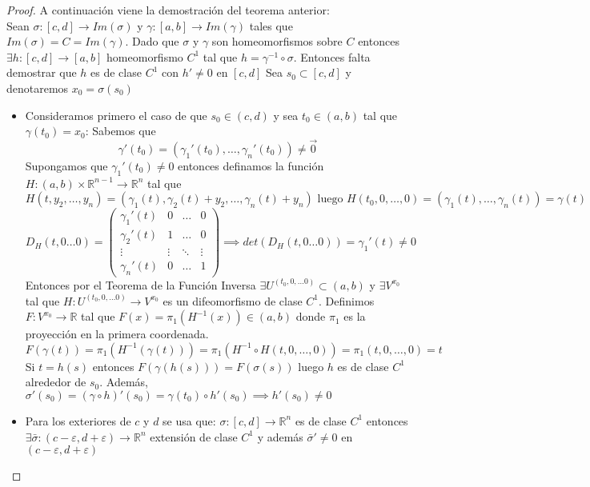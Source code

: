 \begin{proof}
    A continuación viene la demostración del teorema anterior: \\
    Sean $\sigma: [c,d] \to Im(\sigma)$ y $\gamma: [a,b] \to Im(\gamma)$ tales que $Im(\sigma) = C = Im(\gamma)$.
    Dado que $\sigma$ y $\gamma$ son homeomorfismos sobre $C$ entonces $\exists h: [c,d] \to [a,b]$ homeomorfismo $C^1$ tal que $h = \gamma^{-1} \circ \sigma$.
    Entonces falta demostrar que $h$ es de clase $C^1$ con $h' \neq 0$ en $[c,d]$
    Sea $s_0 \subset [c,d]$ y denotaremos $x_0 = \sigma(s_0)$
    \begin{itemize}
        \item     Consideramos primero el caso de que $s_0 \in (c,d)$ y sea $t_0 \in (a, b)$ tal
              que $\gamma(t_0) = x_0$: Sabemos que $$\gamma'(t_0) = (\gamma_1'(t_0), \ldots,
                  \gamma_n'(t_0)) \neq \vec{0}$$ Supongamos que $\gamma_1'(t_0) \neq 0$ entonces
              definamos la función $H: (a, b) \times \mathbb{R}^{n-1} \to \mathbb{R}^{n}$ tal
              que $$H(t, y_2, \ldots, y_n) = (\gamma_1(t), \gamma_2(t) + y_2, \ldots,
                  \gamma_n(t) + y_n) \text{ luego } H(t_0, 0, \ldots, 0) = (\gamma_1(t), \ldots,
                  \gamma_n(t)) = \gamma(t)$$ $$D_H(t, 0 \ldots 0) = \left(
                  \begin{array}{c|ccc}
                          \gamma_1'(t) & 0      & \ldots & 0      \\
                          \hline
                          \gamma_2'(t) & 1      & \ldots & 0      \\
                          \vdots       & \vdots & \ddots & \vdots \\
                          \gamma_n'(t) & 0      & \ldots & 1
                      \end{array}
                  \right) \implies det(D_H(t, 0 \ldots 0)) = \gamma_1'(t) \neq 0$$
              Entonces por el Teorema de la Función Inversa $\exists U^{(t_0, 0, \ldots 0)} \subset (a, b)$ y $\exists V^{x_0}$ tal que $H: U^{(t_0, 0, \ldots 0)} \to V^{x_0}$ es un difeomorfismo de clase $C^1$. Definimos $F: V^{x_0} \to \mathbb{R}$ tal que $F(x) = \pi_1(H^{-1}(x)) \in (a,b)$ donde $\pi_1$ es la proyección en la primera coordenada. \\
              $$F(\gamma(t)) = \pi_1(H^{-1}(\gamma(t))) = \pi_1(H^{-1} \circ H(t, 0, \ldots, 0)) = \pi_1(t, 0, \ldots, 0) = t$$
              Si $t = h(s)$ entonces $F(\gamma(h(s))) = F(\sigma(s))$ luego $h$ es de clase $C^1$ alrededor de $s_0$. Además, $\sigma'(s_0) = (\gamma \circ h)'(s_0) = \gamma(t_0) \circ h'(s_0) \implies h'(s_0) \neq 0$ \\
        \item Para los exteriores de $c$ y $d$ se usa que: $\sigma: [c,d] \to \mathbb{R}^n$
              es de clase $C^1$ entonces $\exists \bar{\sigma}: (c - \varepsilon, d + \varepsilon)
                  \to \mathbb{R}^n$ extensión de clase $C^1$ y además $\bar{\sigma}' \neq 0$ en
              $(c - \varepsilon, d + \varepsilon)$
    \end{itemize}
\end{proof}

